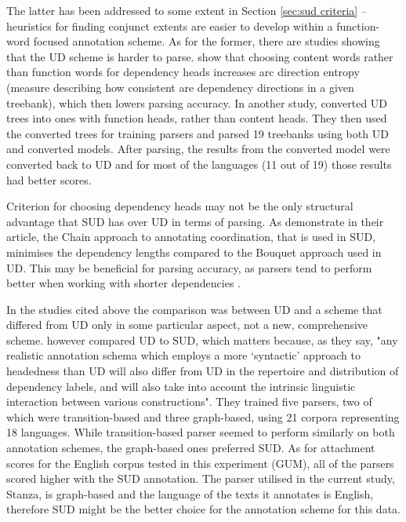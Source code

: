The latter has been addressed to some extent in Section \ref{sec:sud criteria} -- heuristics for finding conjunct extents are easier to develop within a function-word focused annotation scheme. As for the former, there are studies showing that the UD scheme is harder to parse. \cite{rehbein-etal-2017-universal} show that choosing content words rather than function words for dependency heads increases arc direction entropy (measure describing how consistent are dependency directions in a given treebank), which then lowers parsing accuracy. In another study, \cite{kohita-etal-2017-multilingual} converted UD trees into ones with function heads, rather than content heads. They then used the converted trees for training parsers and parsed 19 treebanks using both UD and converted models. After parsing, the results from the converted model were converted back to UD and for most of the languages (11 out of 19) those results had better scores. 

Criterion for choosing dependency heads may not be the only structural advantage that SUD has over UD in terms of parsing. As \cite{gerdes-etal-2018-sud} demonstrate in their article, the Chain approach to annotating coordination, that is used in SUD, minimises the dependency lengths compared to the Bouquet approach used in UD. This may be beneficial for parsing accuracy, as parsers tend to perform better when working with shorter dependencies \citep{nilsson-etal-2006-graph, eisner-smith-2005-parsing}. 

In the studies cited above the comparison was between UD and a scheme that differed from UD only in some particular aspect, not a new, comprehensive scheme. \cite{tuo:prz:lac:21} however compared UD to SUD, which matters because, as they say, "any realistic annotation schema which employs a more ‘syntactic’ approach to headedness than UD will also differ from UD in the repertoire and distribution of dependency labels, and will also take into account the intrinsic linguistic interaction between various constructions". They trained five parsers, two of which were transition-based and three graph-based, using 21 corpora representing 18 languages. While transition-based parser seemed to perform similarly on both annotation schemes, the graph-based ones preferred SUD. As for attachment scores for the English corpus tested in this experiment (GUM), all of the parsers scored higher with the SUD annotation. The parser utilised in the current study, Stanza, is graph-based and the language of the texts it annotates is English, therefore SUD might be the better choice for the annotation scheme for this data. 

